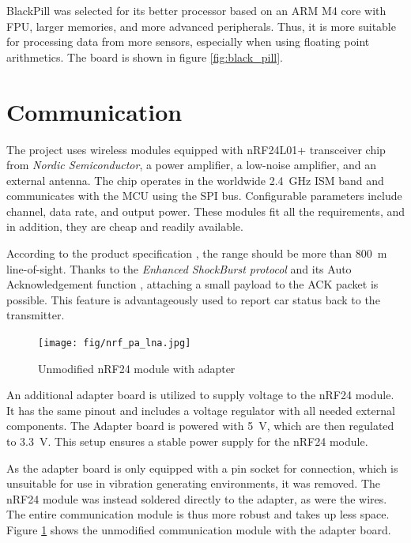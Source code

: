 BlackPill was selected for its better processor based on an ARM M4 core with FPU, larger memories, and more advanced peripherals. Thus, it is more suitable for processing data from more sensors, especially when using floating point arithmetics. The board is shown in figure \ref{fig:black_pill}.


%


\section{Communication}
\label{sec:hw_comm}
The project uses wireless modules equipped with nRF24L01+ transceiver chip from \textit{Nordic Semiconductor}, a power amplifier, a low-noise amplifier, and an external antenna. The chip operates in the worldwide \SI{2.4}{\GHz} ISM band and communicates with the MCU using the SPI bus. Configurable parameters include channel, data rate, and output power. These modules fit all the requirements, and in addition, they are cheap and readily available.

According to the product specification \cite{nrf_pa_lna}, the range should be more than \SI{800}{\m} line-of-sight. Thanks to the \textit{Enhanced ShockBurst protocol} and its Auto Acknowledgement function \cite{nrf_datasheet}, attaching a small payload to the ACK packet is possible. This feature is advantageously used to report car status back to the transmitter.
\begin{figure}[h]
\centering
\texttt{[image: fig/nrf\_pa\_lna.jpg]}
\caption{Unmodified nRF24 module with adapter}
\label{fig:unmod_nrf}
\end{figure}

An additional adapter board is utilized to supply voltage to the nRF24 module. It has the same pinout and includes a voltage regulator with all needed external components. The Adapter board is powered with \SI{5}{\V}, which are then regulated to \SI{3.3}{\V}. This setup ensures a stable power supply for the nRF24 module.

As the adapter board is only equipped with a pin socket for connection, which is unsuitable for use in vibration generating environments, it was removed. The nRF24 module was instead soldered directly to the adapter, as were the wires. The entire communication module is thus more robust and takes up less space. Figure \ref{fig:unmod_nrf} shows the unmodified communication module with the adapter board.


